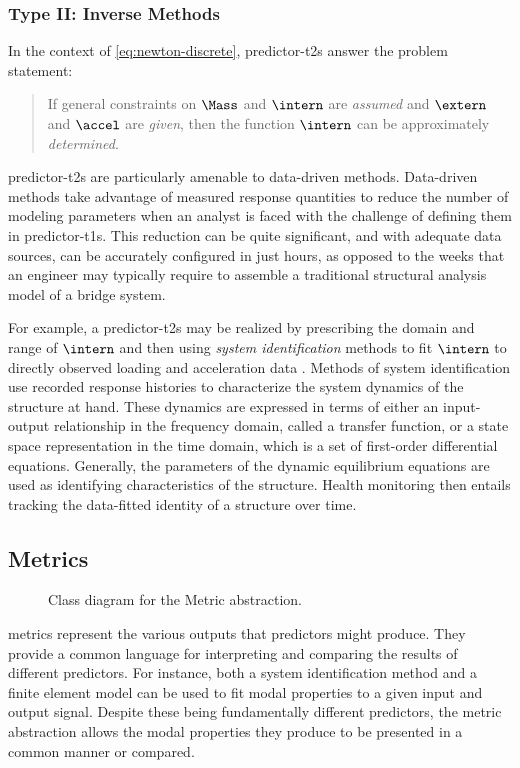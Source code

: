 \subsubsection{Type II: Inverse Methods}
In the context of \eqref{eq:newton-discrete}, \glspl{predictor-t2} answer the problem statement:
\begin{quote}
 If general constraints on $\Mass$ and $\intern$ are \emph{assumed} and $\extern$ and $\accel$ are \emph{given}, then the function $\intern$ can be approximately \emph{determined}.
\end{quote}
%
\glspl{predictor-t2} are particularly amenable to data-driven methods.
%
Data-driven methods take advantage of measured response quantities to reduce the number of modeling parameters when an analyst is faced with the challenge of defining them in \glspl{predictor-t1}.
This reduction can be quite significant, and with adequate data sources, can be accurately configured in just hours, as opposed to the weeks
that an engineer may typically require to assemble a traditional structural analysis model of a bridge system.

For example, a \glspl{predictor-t2} may be realized by prescribing the domain and range of $\intern$ and then using \emph{system identification} methods to fit $\intern$ to directly observed loading and acceleration data \citep{arici2003system,chern2024crosssectional}.
Methods of system identification use recorded response histories to characterize the system dynamics of the structure at hand. These dynamics are expressed in terms of either an input-output relationship in the frequency domain, called a transfer function, or a state space representation in the time domain, which is a set of first-order differential equations. 
Generally, the parameters of the dynamic equilibrium equations are used as identifying characteristics of the structure. 
Health monitoring then entails tracking the data-fitted identity of a structure over time.

\subsection{Metrics}
\begin{figure}[H]
    \centering
    \resizebox{0.9\linewidth}{!}{}
    \caption{Class diagram for the Metric abstraction.}
    \label{fig:metric-class}
\end{figure}
\glspl{metric} represent the various outputs that \glspl{predictor} might produce. They provide a common language for interpreting and comparing the results of different \glspl{predictor}. For instance, both a system identification method and a finite element model can be used to fit modal properties to a given input and output signal. 
Despite these being fundamentally different \glspl{predictor}, the \gls{metric} abstraction allows the modal properties they produce to be presented in a common manner or compared.

